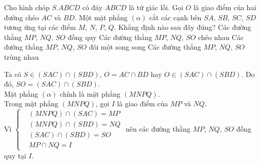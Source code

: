 \begin{ex}%
Cho hình chóp $S.ABCD$ có đáy $ABCD$ là tứ giác lồi. Gọi $O$ là giao điểm của hai đường chéo $AC$ và $BD$. Một mặt phẳng $(\alpha)$ cắt các cạnh bên $SA$, $SB$, $SC$, $SD$ tương ứng tại các điểm $M$, $N$, $P$, $Q$. Khẳng định nào sau đây đúng?
\choice
{\True Các đường thẳng $MP$, $NQ$, $SO$ đồng quy}
{Các đường thẳng $MP$, $NQ$, $SO$ chéo nhau}
{Các đường thẳng $MP$, $NQ$, $SO$ đôi một song song}
{Các đường thẳng $MP$, $NQ$, $SO$ trùng nhau}
\loigiai
{
\immini
{
Ta có $S\in (SAC)\cap (SBD)$, $O=AC\cap BD$ hay $O\in (SAC)\cap (SBD)$. Do đó, $SO=(SAC)\cap (SBD)$.\\
Mặt phẳng $(\alpha)$ chính là mặt phẳng $(MNPQ)$.\\
Trong mặt phẳng $(MNPQ)$, gọi $I$ là giao điểm của $MP$ và $NQ$.\\
Vì $\left\{\begin{aligned}&(MNPQ)\cap (SAC)=MP \\&(MNPQ)\cap (SBD)=NQ \\&(SAC)\cap (SBD)=SO \\&MP\cap NQ=I\end{aligned}\right.$ nên các đường thẳng $MP$, $NQ$, $SO$ đồng quy tại $I$.
}
{
}
}
\end{ex}

